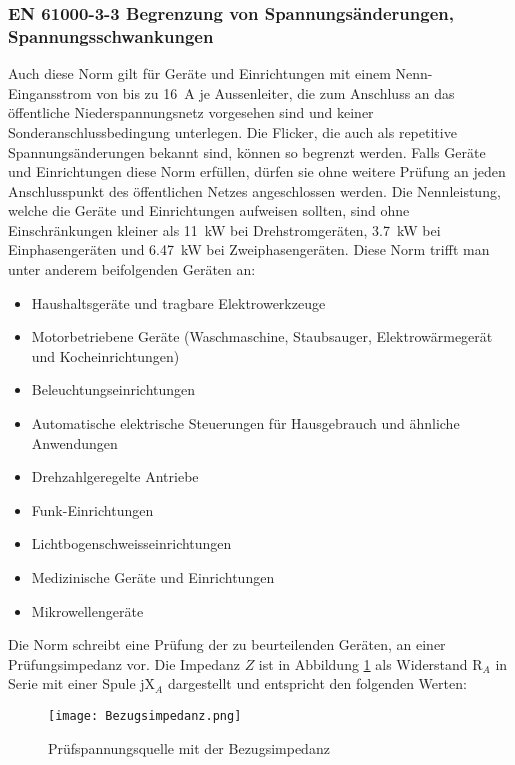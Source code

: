 \begin{appendix}
\subsubsection{EN 61000-3-3 Begrenzung von Spannungsänderungen, Spannungsschwankungen} \label{sec:flickernorm}
Auch diese Norm gilt für Geräte und Einrichtungen mit einem Nenn-Eingansstrom von bis zu \SI{16}{A} je Aussenleiter, die zum Anschluss an das öffentliche Niederspannungsnetz vorgesehen sind und keiner Sonderanschlussbedingung unterlegen. Die Flicker, die auch als repetitive Spannungsänderungen bekannt sind, können so begrenzt werden. Falls Geräte und Einrichtungen diese Norm erfüllen, dürfen sie ohne weitere Prüfung an jeden Anschlusspunkt des öffentlichen Netzes angeschlossen werden. Die Nennleistung, welche die Geräte und Einrichtungen aufweisen sollten, sind ohne Einschränkungen kleiner als \SI{11}{kW} bei Drehstromgeräten, \SI{3.7}{kW} bei Einphasengeräten und \SI{6.47}{kW} bei Zweiphasengeräten. Diese Norm trifft man unter anderem beifolgenden Geräten an:
\begin{itemize}
	\item Haushaltsgeräte und tragbare Elektrowerkzeuge 
	\item Motorbetriebene Geräte (Waschmaschine, Staubsauger, Elektrowärmegerät und Kocheinrichtungen)
	\item Beleuchtungseinrichtungen
	\item Automatische elektrische Steuerungen für Hausgebrauch und ähnliche Anwendungen
	\item Drehzahlgeregelte Antriebe
	\item Funk-Einrichtungen
	\item Lichtbogenschweisseinrichtungen
	\item Medizinische Geräte und Einrichtungen
	\item Mikrowellengeräte	
\end{itemize}

Die Norm schreibt eine Prüfung der zu beurteilenden Geräten, an einer Prüfungsimpedanz vor. Die Impedanz $Z$ ist in Abbildung \ref{fig:Bezugsimpedanz} als Widerstand R$_A$ in Serie mit einer Spule jX$_A$ dargestellt und entspricht den folgenden Werten:


\begin{figure}[ht!]
	\centering
	\texttt{[image: Bezugsimpedanz.png]}	
	\caption{Prüfspannungsquelle mit der Bezugsimpedanz}
	\label{fig:Bezugsimpedanz}
\end{figure}


\end{appendix}

